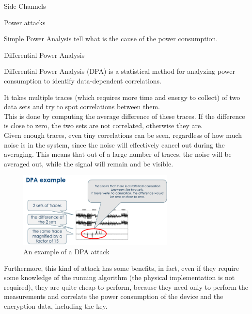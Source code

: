 \begin{section}{Side Channels}
\begin{subsection}{Power attacks}
\begin{subsubsection}{Simple Power Analysis}
      tell what is the cause of the power consumption.
    \end{subsubsection}
    \begin{subsubsection}{Differential Power Analysis}
      \begin{boxH}
        Differential Power Analysis (DPA) is a statistical method for analyzing power consumption to
        identify data-dependent correlations.
      \end{boxH}
      It takes multiple traces (which requires more time and energy to collect) of two data sets and
      try to spot correlations between them.\\
      This is done by computing the average difference of these traces. If the difference is close
      to zero, the two sets are not correlated, otherwise they are.\\
      Given enough traces, even tiny correlations can be seen, regardless of how much noise is in
      the system, since the noise will effectively cancel out during the averaging. This means that
      out of a large number of traces, the noise will be averaged out, while the signal will remain
      and be visible.

      \begin{figure}[h]
        \centering
        \includegraphics[width=0.7\textwidth]{img/hardware/dpa attack.png}
        \caption{An example of a DPA attack}
      \end{figure}
      Furthermore, this kind of attack has some benefits, in fact, even if they require some
      knowledge of the running algorithm (the physical implementation is not required), they are
      quite cheap to perform, because they need only to perform the measurements and correlate the
      power consumption of the device and the encryption data, including the key.\\
    \end{subsubsection}

  \end{subsection}

\end{section}

